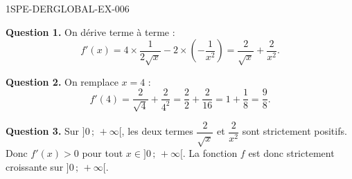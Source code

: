 \begin{corrige}{1SPE-DERGLOBAL-EX-006}

\textbf{Question 1.} On dérive terme à terme :
\[
f'(x) = 4 \times \frac{1}{2\sqrt{x}} - 2 \times \left(-\frac{1}{x^2}\right) = \frac{2}{\sqrt{x}} + \frac{2}{x^2}.
\]

\textbf{Question 2.} On remplace $x = 4$ :
\[
f'(4) = \frac{2}{\sqrt{4}} + \frac{2}{4^2} = \frac{2}{2} + \frac{2}{16} = 1 + \frac{1}{8} = \boxed{\frac{9}{8}}.
\]

\textbf{Question 3.} Sur $]0\,;\,+\infty[$, les deux termes $\dfrac{2}{\sqrt{x}}$ et $\dfrac{2}{x^2}$ sont strictement positifs. Donc $f'(x) > 0$ pour tout $x \in ]0\,;\,+\infty[$. La fonction $f$ est donc strictement croissante sur $]0\,;\,+\infty[$.
\end{corrige}
